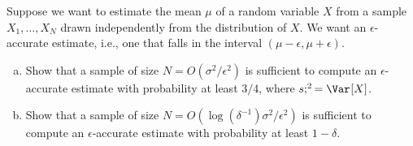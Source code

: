 \begin{problem*}[Exercise 2.2.9]\label{ex2.2.9}
	Suppose we want to estimate the mean \(\mu \) of a random variable \(X\) from a sample \(X_1, \dots , X_N\) drawn independently from the distribution of \(X\). We want an \(\epsilon \)-accurate estimate, i.e., one that falls in the interval \((\mu - \epsilon , \mu + \epsilon )\).
	\begin{enumerate}[(a)]
		\item\label{ex2.2.9:a} Show that a sample of size \(N = O(\sigma ^2 / \epsilon ^2)\) is sufficient to compute an \(\epsilon \)-accurate estimate with probability at least \(3 / 4\), where \(s;^2 = \Var_{}[X] \).
		\item\label{ex2.2.9:b} Show that a sample of size \(N = O(\log (\delta ^{-1} ) \sigma ^2 / \epsilon ^2)\)  is sufficient to compute an \(\epsilon \)-accurate estimate with probability at least \(1 - \delta \).
	\end{enumerate}
\end{problem*}
